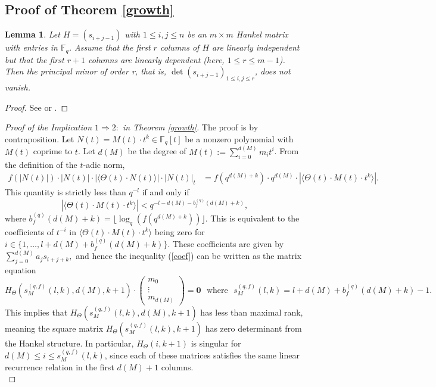 \documentclass{article}
\newtheorem{lemma}[theorem]{Lemma}
\theoremstyle{definition}
\newcommand{\F}{\mathbb{F}}
\numberwithin{equation}{subsection}
\begin{document}
\subsection{Proof of Theorem \ref{growth}} 
\begin{lemma}\label{famous} Let $H = (s_{i+j-1})$ with $1\le i,j\le n$
be an $m \times m$ Hankel matrix with entries in $\F_q$. Assume that
the first $r$ columns of $H$ are linearly independent but that the first $r + 1$ columns are linearly dependent (here, $1 \le r \le m-1$). Then the principal minor of order r, that is, $\det(s_{i+j-1})_{1\le i,j\le r}$, does not vanish.
    \end{lemma}
\begin{proof}
   See \cite[Lemma 2.3]{Faustin} or \cite[Chapter 10]{Theoryofmat}. \end{proof}
\begin{proof}[Proof of the Implication $1\Rightarrow2:$ in Theorem \ref{growth}]

\noindent The proof is by contraposition. Let $N(t)=M(t)\cdot t^k\in\F_q[t]$ be a nonzero polynomial with $M(t)$ coprime to $t$. Let $d(M)$ be the degree of $M(t):=\sum_{i=0}^{d(M)}m_it^i$. From the definition of the $t$-adic norm, \begin{align}f(|N(t)|)\cdot|N(t)|\cdot|\langle\Theta(t)\cdot N(t) \rangle|\cdot |N(t)|_t&=f(q^{d(M)+k})\cdot q^{d(M)}\cdot|\langle\Theta(t)\cdot M(t) \cdot t^k\rangle|. \label{twindow}
\end{align}  This quantity is strictly less than $q^{-l}$ if and only if \begin{equation}\label{coef}|\langle\Theta(t)\cdot M(t)\cdot t^k\rangle|<q^{-l-d(M)-b_f^{(q)}(d(M)+k)},\end{equation} where $b_f^{(q)}(d(M)+k)=\lfloor\log_q(f(q^{d(M)+k}))\rfloor$. This is equivalent to the coefficients of $t^{-i}$ in $\langle\Theta(t)\cdot M(t)\cdot t^k\rangle$ being zero for $i\in\{1,\dots,l+d(M)+b_f^{(q)}(d(M)+k)\}.$ These coefficients are given by $\sum_{j=0}^{d(M)} a_js_{i+j+k},$ and hence the inequality (\ref{coef}) can be written as the matrix equation \begin{equation}H_\Theta\left( s_M^{(q,f)}(l,k), d(M),k+1\right)\cdot\begin{pmatrix}
    m_0\\\vdots\\m_{d(M)}
\end{pmatrix}=\mathbf{0}~~~\text{where}~~~ s_M^{(q,f)}(l,k)=l+d(M)+b_f^{(q)}(d(M)+k)-1.\label{zeromat}\end{equation} This implies that $H_\Theta\left( s_M^{(q,f)}(l,k), d(M), k+1\right)$ has less than maximal rank, meaning the square matrix $H_\Theta\left(s_M^{(q,f)}(l,k),k+1\right)$ has zero determinant from the Hankel structure. In particular, $H_\Theta(i, k+1)$ is singular for $d(M)\le i \le s_M^{(q,f)}(l,k)$, since each of these matrices satisfies the same linear recurrence relation in the first $d(M)+1$ columns. \\
    

\end{proof}
\end{document}
